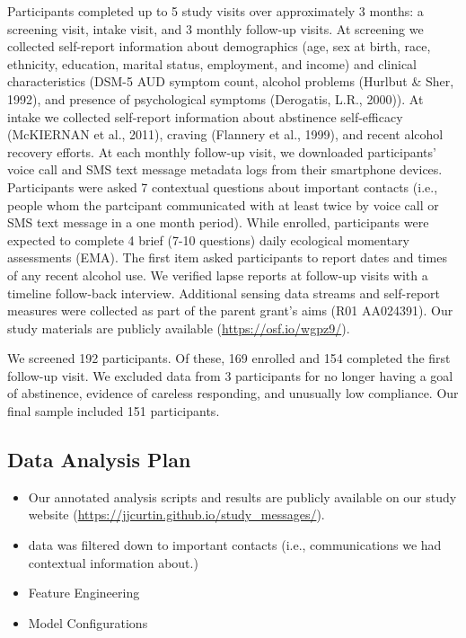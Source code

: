 \documentclass[
  letterpaper,
  DIV=11,
  numbers=noendperiod]{scrartcl}
\begin{document}
Participants completed up to 5 study visits over approximately 3 months:
a screening visit, intake visit, and 3 monthly follow-up visits. At
screening we collected self-report information about demographics (age,
sex at birth, race, ethnicity, education, marital status, employment,
and income) and clinical characteristics (DSM-5 AUD symptom count,
alcohol problems (Hurlbut \& Sher, 1992), and presence of psychological
symptoms (Derogatis, L.R., 2000)). At intake we collected self-report
information about abstinence self-efficacy (McKIERNAN et al., 2011),
craving (Flannery et al., 1999), and recent alcohol recovery efforts. At
each monthly follow-up visit, we downloaded participants' voice call and
SMS text message metadata logs from their smartphone devices.
Participants were asked 7 contextual questions about important contacts
(i.e., people whom the partcipant communicated with at least twice by
voice call or SMS text message in a one month period). While enrolled,
participants were expected to complete 4 brief (7-10 questions) daily
ecological momentary assessments (EMA). The first item asked
participants to report dates and times of any recent alcohol use. We
verified lapse reports at follow-up visits with a timeline follow-back
interview. Additional sensing data streams and self-report measures were
collected as part of the parent grant's aims (R01 AA024391). Our study
materials are publicly available (\url{https://osf.io/wgpz9/}).

We screened 192 participants. Of these, 169 enrolled and 154 completed
the first follow-up visit. We excluded data from 3 participants for no
longer having a goal of abstinence, evidence of careless responding, and
unusually low compliance. Our final sample included 151 participants.

\subsection{Data Analysis Plan}\label{data-analysis-plan}

\begin{itemize}
\item
  Our annotated analysis scripts and results are publicly available on
  our study website (\url{https://jjcurtin.github.io/study_messages/}).
\item
  data was filtered down to important contacts (i.e., communications we
  had contextual information about.)
\item
  Feature Engineering
\item
  Model Configurations
\end{itemize}
\end{document}
